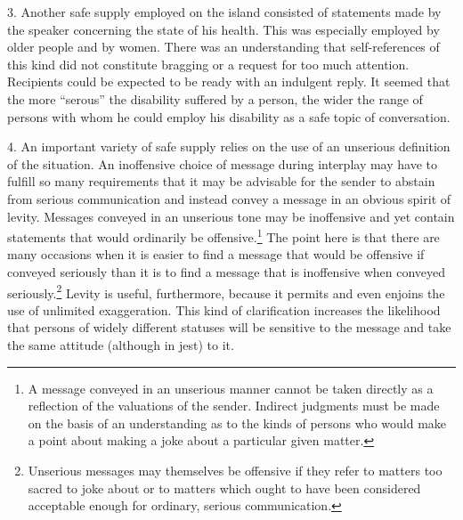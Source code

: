 \documentclass[openany,nobib]{tufte-book}
\begin{document}
3. Another safe supply employed on the island consisted of statements
made by the speaker concerning the state of his health. This was
especially employed by older people and by women. There was an
understanding that self-references of this kind did not constitute
bragging or a request for too much attention. Recipients could be
expected to be ready with an indulgent reply. It seemed that the more
``serous'' the disability suffered by a person, the wider the range of
persons with whom he could employ his disability as a safe topic of
conversation.

4. An important variety of safe supply relies on the use of an unserious
definition of the situation. An inoffensive choice of message during
interplay may have to fulfill so many requirements that it may be
advisable for the sender to abstain from serious communication and
instead convey a message in an obvious spirit of levity. Messages
conveyed in an unserious tone may be inoffensive and yet contain
statements that would ordinarily be offensive.\footnote{A message
  conveyed in an unserious manner cannot be taken directly as a
  reflection of the valuations of the sender. Indirect judgments must be
  made on the basis of an understanding as to the kinds of persons who
  would make a point about making a joke about a particular given
  matter.} The point here is that there are many occasions when it is
easier to find a message that would be offensive if conveyed seriously
than it is to find a message that is inoffensive when conveyed
seriously.\footnote{Unserious messages may themselves be offensive if
  they refer to matters too sacred to joke about or to matters which
  ought to have been considered acceptable enough for ordinary, serious
  communication.} Levity is useful, furthermore, because it permits and
even enjoins the use of unlimited exaggeration. This kind of
clarification increases the likelihood that persons of widely different
statuses will be sensitive to the message and take the same attitude
(although in jest) to it.
\end{document}
